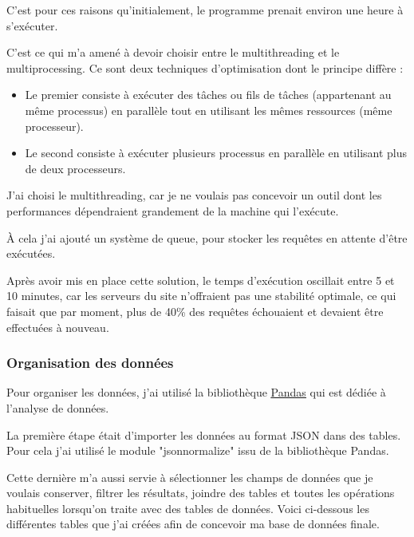 C'est pour ces raisons qu'initialement, le programme prenait environ une heure à s'exécuter.

C'est ce qui m'a amené à devoir choisir entre le multithreading et le multiprocessing. Ce sont deux techniques d'optimisation dont le principe diffère :
\begin{itemize}
\item Le premier consiste à exécuter des tâches ou fils de tâches (appartenant au même processus) en parallèle tout en utilisant les mêmes ressources (même processeur).
\item Le second consiste à exécuter plusieurs processus en parallèle en utilisant plus de deux processeurs.
\end{itemize}

J'ai choisi le multithreading, car je ne voulais pas concevoir un outil dont les performances dépendraient grandement de la machine qui l'exécute.

À cela j'ai ajouté un système de queue, pour stocker les requêtes en attente d'être exécutées.

Après avoir mis en place cette solution, le temps d'exécution oscillait entre 5 et 10 minutes, car les serveurs du site n'offraient pas une stabilité optimale, ce qui faisait que par moment, plus de 40\% des requêtes échouaient et devaient être effectuées à nouveau.

\subsubsection{Organisation des données}

Pour organiser les données, j'ai utilisé la bibliothèque \underline{\href{https://pandas.pydata.org}{Pandas}} qui est dédiée à l'analyse de données.

La première étape était d'importer les données au format JSON dans des tables. Pour cela j'ai utilisé le module "jsonnormalize" issu de la bibliothèque Pandas.

Cette dernière m'a aussi servie à sélectionner les champs de données que je voulais conserver, filtrer les résultats, joindre des tables et toutes les opérations habituelles lorsqu'on traite avec des tables de données.
Voici ci-dessous les différentes tables que j'ai créées afin de concevoir ma base de données finale.

